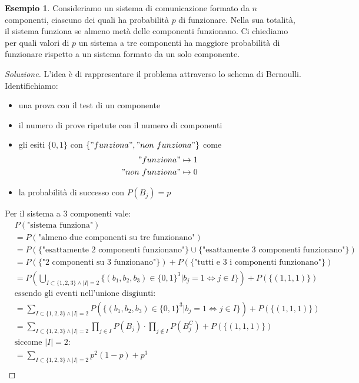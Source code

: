 \documentclass{article}
\theoremstyle{plain}
\theoremstyle{definition}
\newtheorem{esempio}{Esempio}[section]
\theoremstyle{remark}
\newenvironment{soluzione}
	{\renewcommand\qedsymbol{$\mathwitch*$}\begin{proof}[Soluzione]}
	{\end{proof}}
\renewcommand{\qedsymbol}{$\mathrightghost$}
\begin{document}
\begin{esempio}
	Consideriamo un sistema di comunicazione formato da $n$ componenti, ciascuno dei quali ha probabilità $p$ di funzionare. Nella sua totalità, il sistema funziona se almeno metà delle componenti funzionano. Ci chiediamo per quali valori di $p$ un sistema a tre componenti ha maggiore probabilità di funzionare rispetto a un sistema formato da un solo componente.
	\begin{soluzione}
		L'idea è di rappresentare il problema attraverso lo schema di Bernoulli. Identifichiamo:
		\begin{itemize}
			\item una prova con il test di un componente
			\item il numero di prove ripetute con il numero di componenti
			\item gli esiti $\{0,1\}$ con $\{"funziona","non\ funziona"\}$ come
			\begin{align*}
				"funziona"&\mapsto1\\
				"non\ funziona"&\mapsto0
			\end{align*}
			\item la probabilità di successo con $P(B_j)=p$
		\end{itemize}
		Per il sistema a $3$ componenti vale:
		\begin{align*}
			&P(\text{"sistema funziona"})\\
			&=P(\text{"almeno due componenti su tre funzionano"})\\
			&=P(\{\text{"esattamente 2 componenti funzionano"}\}\cup\{\text{"esattamente 3 componenti funzionano"}\})\\
			&=P(\{\text{"2 componenti su 3 funzionano"}\})+P(\{\text{"tutti e 3 i componenti funzionano"}\})\\
			&=P(\bigcup_{I\subset\{1,2,3\}\wedge \lvert I\rvert=2}\{(b_1,b_2,b_3)\in\{0,1\}^3|b_j=1\Leftrightarrow j\in I\})+P(\{(1,1,1)\})\\
			&\text{essendo gli eventi nell'unione disgiunti:}\\
			&=\sum_{I\subset\{1,2,3\}\wedge \lvert I\rvert=2}P(\{(b_1,b_2,b_3)\in\{0,1\}^3|b_j=1\Leftrightarrow j\in I\})+P(\{(1,1,1)\})\\
			&=\sum_{I\subset\{1,2,3\}\wedge \lvert I\rvert=2}\prod_{j\in I}P(B_j)\cdot\prod_{j\notin I}P(B_j^C)+P(\{(1,1,1)\})\\
			&\text{siccome }\lvert I\rvert=2\text{:}\\
			&=\sum_{I\subset\{1,2,3\}\wedge \lvert I\rvert=2}p^2 (1-p)+p^3\\

\end{align*}
\end{soluzione}
\end{esempio}
\end{document}
